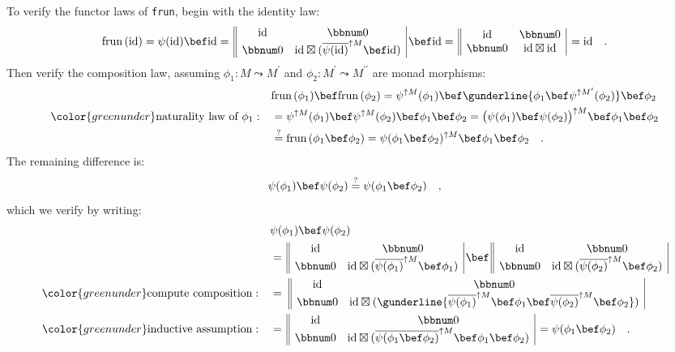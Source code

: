 To verify the functor laws of \lstinline!frun!, begin with the identity
law:
\[
\text{frun}\,(\text{id})=\psi(\text{id})\bef\text{id}=\,\begin{array}{||cc|}
\text{id} & \bbnum 0\\
\bbnum 0 & \text{id}\boxtimes(\overline{\psi(\text{id)}}^{\uparrow M}\bef\text{id})
\end{array}\,\bef\text{id}=\,\begin{array}{||cc|}
\text{id} & \bbnum 0\\
\bbnum 0 & \text{id}\boxtimes\text{id}
\end{array}\,=\text{id}\quad.
\]
Then verify the composition law, assuming $\phi_{1}:M\leadsto M^{\prime}$
and $\phi_{2}:M^{\prime}\leadsto M^{\prime\prime}$ are monad morphisms:
\begin{align*}
 & \text{frun}\,(\phi_{1})\bef\text{frun}\,(\phi_{2})=\psi^{\uparrow M}(\phi_{1})\bef\gunderline{\phi_{1}\bef\psi^{\uparrow M^{\prime}}(\phi_{2})}\bef\phi_{2}\\
{\color{greenunder}\text{naturality law of }\phi_{1}:}\quad & =\psi^{\uparrow M}(\phi_{1})\bef\psi^{\uparrow M}(\phi_{2})\bef\phi_{1}\bef\phi_{2}=\big(\psi(\phi_{1})\bef\psi(\phi_{2})\big)^{\uparrow M}\bef\phi_{1}\bef\phi_{2}\\
 & \overset{?}{=}\text{frun}\,(\phi_{1}\bef\phi_{2})=\psi(\phi_{1}\bef\phi_{2})^{\uparrow M}\bef\phi_{1}\bef\phi_{2}\quad.
\end{align*}
The remaining difference is:
\[
\psi(\phi_{1})\bef\psi(\phi_{2})\overset{?}{=}\psi(\phi_{1}\bef\phi_{2})\quad,
\]
which we verify by writing:
\begin{align*}
 & \psi(\phi_{1})\bef\psi(\phi_{2})\\
 & =\,\begin{array}{||cc|}
\text{id} & \bbnum 0\\
\bbnum 0 & \text{id}\boxtimes(\overline{\psi(\phi_{1}\text{)}}^{\uparrow M}\bef\phi_{1})
\end{array}\,\bef\,\begin{array}{||cc|}
\text{id} & \bbnum 0\\
\bbnum 0 & \text{id}\boxtimes(\overline{\psi(\phi_{2}\text{)}}^{\uparrow M}\bef\phi_{2})
\end{array}\\
{\color{greenunder}\text{compute composition}:}\quad & =\,\,\begin{array}{||cc|}
\text{id} & \bbnum 0\\
\bbnum 0 & \text{id}\boxtimes(\gunderline{\overline{\psi(\phi_{1}\text{)}}^{\uparrow M}\bef\phi_{1}\bef\overline{\psi(\phi_{2}\text{)}}^{\uparrow M}\bef\phi_{2}})
\end{array}\\
{\color{greenunder}\text{inductive assumption}:}\quad & =\,\begin{array}{||cc|}
\text{id} & \bbnum 0\\
\bbnum 0 & \text{id}\boxtimes(\overline{\psi(\phi_{1}\bef\phi_{2}\text{)}}^{\uparrow M}\bef\phi_{1}\bef\phi_{2})
\end{array}\,=\psi(\phi_{1}\bef\phi_{2})\quad.
\end{align*}


